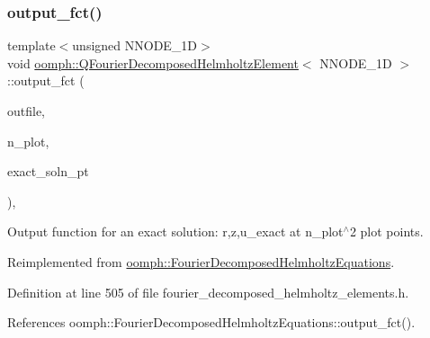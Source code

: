 \subsubsection{\texorpdfstring{output\+\_\+fct()}{output\_fct()}\hspace{0.1cm}{\footnotesize\ttfamily [1/2]}}
{\footnotesize\ttfamily template$<$unsigned N\+N\+O\+D\+E\+\_\+1D$>$ \\
void \hyperlink{classoomph_1_1QFourierDecomposedHelmholtzElement}{oomph\+::\+Q\+Fourier\+Decomposed\+Helmholtz\+Element}$<$ N\+N\+O\+D\+E\+\_\+1D $>$\+::output\+\_\+fct (\begin{DoxyParamCaption}\item[{std\+::ostream \&}]{outfile,  }\item[{const unsigned \&}]{n\+\_\+plot,  }\item[{\hyperlink{classoomph_1_1FiniteElement_a690fd33af26cc3e84f39bba6d5a85202}{Finite\+Element\+::\+Steady\+Exact\+Solution\+Fct\+Pt}}]{exact\+\_\+soln\+\_\+pt }\end{DoxyParamCaption})\hspace{0.3cm}{\ttfamily [inline]}, {\ttfamily [virtual]}}



Output function for an exact solution\+: r,z,u\+\_\+exact at n\+\_\+plot$^\wedge$2 plot points. 



Reimplemented from \hyperlink{classoomph_1_1FourierDecomposedHelmholtzEquations_a9024cd81a80a4709b127560b6f15cd43}{oomph\+::\+Fourier\+Decomposed\+Helmholtz\+Equations}.



Definition at line 505 of file fourier\+\_\+decomposed\+\_\+helmholtz\+\_\+elements.\+h.



References oomph\+::\+Fourier\+Decomposed\+Helmholtz\+Equations\+::output\+\_\+fct().

\mbox{\label{classoomph_1_1QFourierDecomposedHelmholtzElement_a3552971f652e8b07888071fd8ada95cc}} 
